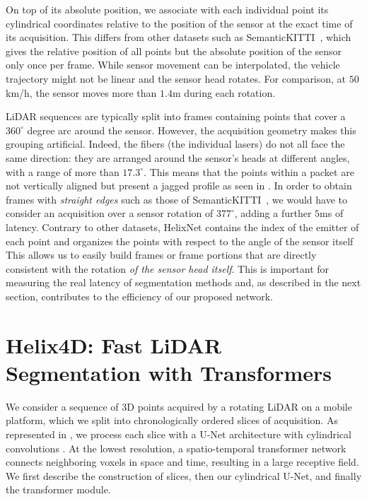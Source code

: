 \documentclass[runningheads]{tpls/llncs}
\begin{document}
On top of its absolute position, we associate with each individual point its cylindrical coordinates relative to the position of the sensor at the exact time of its acquisition. This differs from other datasets such as SemanticKITTI~\cite{behley2019iccv}, which gives the relative position of all points but the absolute position of the sensor only once per frame. While sensor movement can be interpolated, the vehicle trajectory might not be linear and the sensor head rotates. For comparison, at $50$km/h, the sensor moves more than $1.4$m during each rotation.

LiDAR sequences are typically split into frames containing points that cover a $360^\circ$ degree arc around the sensor. However, the acquisition geometry makes this grouping artificial.
Indeed, the fibers (\ie the individual lasers) do not all face the same direction: they are arranged around the sensor's heads at different angles, with a range of more than $17.3^\circ$. This means that the points within a packet are not vertically aligned but present a jagged profile as seen in . In order to obtain frames with \emph{straight edges} such as those of SemanticKITTI~\cite{behley2019iccv}, we would have to consider an acquisition over a sensor rotation of $377^\circ$, adding a further $5$ms of latency.
Contrary to other datasets, HelixNet contains the index of the emitter of each point and organizes the points with respect to the angle of the sensor itself
This allows us to easily build frames or frame portions that are directly consistent with the rotation \emph{of the sensor head itself}. This is important for measuring the real latency of segmentation methods and, as described in the next section, contributes to the efficiency of our proposed network. \section{Helix4D: Fast LiDAR Segmentation with  Transformers}\label{sec:method}

We consider a sequence of 3D points acquired by a rotating LiDAR on a mobile platform, which we split into chronologically ordered slices of acquisition. As represented in , we process each slice with a U-Net architecture \cite{ronneberger2015u} with cylindrical convolutions \cite{zhu2021cylindrical}. At the lowest resolution, a spatio-temporal transformer network connects neighboring voxels in space and time, resulting in a large receptive field.
We first describe the construction of slices, then our cylindrical U-Net, and finally the transformer module.
\end{document}
